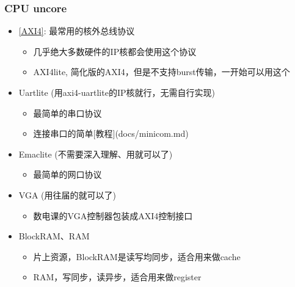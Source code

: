 \documentclass[lang=cn,11pt,a4paper]{elegantpaper}
\begin{document}
\subsubsection{CPU uncore}

\begin{itemize}
\item \href{../manuals/AXI4.pdf}{[AXI4]}: 最常用的核外总线协议
  \begin{itemize}
  \item 几乎绝大多数硬件的IP核都会使用这个协议
  \item AXI4lite, 简化版的AXI4，但是不支持burst传输，一开始可以用这个
  \end{itemize}
\item Uartlite (用axi4-uartlite的IP核就行，无需自行实现)
  \begin{itemize}
  \item 最简单的串口协议
  \item 连接串口的简单[教程](docs/minicom.md)
  \end{itemize}
\item Emaclite (不需要深入理解、用就可以了)
  \begin{itemize}
  \item 最简单的网口协议
  \end{itemize}
\item VGA (用往届的就可以了)
  \begin{itemize}
  \item 数电课的VGA控制器包装成AXI4控制接口
  \end{itemize}
\item BlockRAM、RAM
  \begin{itemize}
  \item 片上资源，BlockRAM是读写均同步，适合用来做cache
  \item RAM，写同步，读异步，适合用来做register
  \end{itemize}
\end{itemize}
\end{document}
